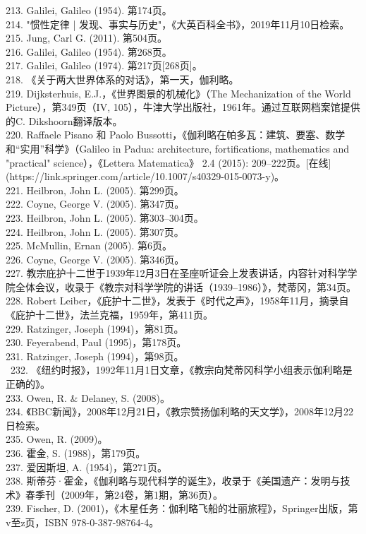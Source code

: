 213. Galilei, Galileo (1954). 第174页。\\
214. "惯性定律 | 发现、事实与历史"，《大英百科全书》，2019年11月10日检索。\\
215. Jung, Carl G. (2011). 第504页。\\
216. Galilei, Galileo (1954). 第268页。\\
217. Galilei, Galileo (1974). 第217页[268页]。\\
218. 《关于两大世界体系的对话》，第一天，伽利略。\\
219. Dijksterhuis, E.J.，《世界图景的机械化》（The Mechanization of the World Picture），第349页（IV, 105），牛津大学出版社，1961年。通过互联网档案馆提供的C. Dikshoorn翻译版本。\\
220. Raffaele Pisano 和 Paolo Bussotti，《伽利略在帕多瓦：建筑、要塞、数学和“实用”科学》（Galileo in Padua: architecture, fortifications, mathematics and "practical" science），《Lettera Matematica》 2.4 (2015): 209–222页。[在线](https://link.springer.com/article/10.1007/s40329-015-0073-y)。\\
221. Heilbron, John L. (2005). 第299页。\\
222. Coyne, George V. (2005). 第347页。\\
223. Heilbron, John L. (2005). 第303–304页。\\
224. Heilbron, John L. (2005). 第307页。\\
225. McMullin, Ernan (2005). 第6页。\\
226. Coyne, George V. (2005). 第346页。\\
227. 教宗庇护十二世于1939年12月3日在圣座听证会上发表讲话，内容针对科学学院全体会议，收录于《教宗对科学学院的讲话（1939–1986）》，梵蒂冈，第34页。\\
228. Robert Leiber，《庇护十二世》，发表于《时代之声》，1958年11月，摘录自《庇护十二世》，法兰克福，1959年，第411页。\\
229. Ratzinger, Joseph (1994)，第81页。\\
230. Feyerabend, Paul (1995)，第178页。\\
231. Ratzinger, Joseph (1994)，第98页。\\\
232. 《纽约时报》，1992年11月1日文章，《教宗向梵蒂冈科学小组表示伽利略是正确的》。\\
233. Owen, R. & Delaney, S. (2008)。\\
234. 《BBC新闻》，2008年12月21日，《教宗赞扬伽利略的天文学》，2008年12月22日检索。\\
235. Owen, R. (2009)。\\
236. 霍金, S. (1988)，第179页。\\
237. 爱因斯坦, A. (1954)，第271页。\\
238. 斯蒂芬·霍金，《伽利略与现代科学的诞生》，收录于《美国遗产：发明与技术》春季刊（2009年，第24卷，第1期，第36页）。\\
239. Fischer, D. (2001)，《木星任务：伽利略飞船的壮丽旅程》，Springer出版，第v至z页，ISBN 978-0-387-98764-4。\\